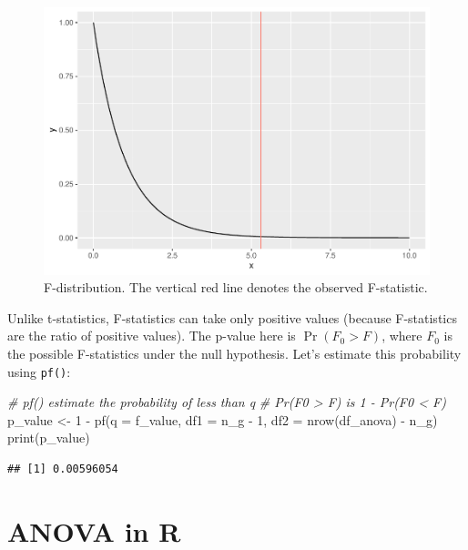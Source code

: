 \documentclass[
]{book}
\newenvironment{Shaded}{\begin{snugshade}}{\end{snugshade}}
\newcommand{\AttributeTok}[1]{\textcolor[rgb]{0.77,0.63,0.00}{#1}}
\newcommand{\CommentTok}[1]{\textcolor[rgb]{0.56,0.35,0.01}{\textit{#1}}}
\newcommand{\DecValTok}[1]{\textcolor[rgb]{0.00,0.00,0.81}{#1}}
\newcommand{\FunctionTok}[1]{\textcolor[rgb]{0.00,0.00,0.00}{#1}}
\newcommand{\NormalTok}[1]{#1}
\newcommand{\OtherTok}[1]{\textcolor[rgb]{0.56,0.35,0.01}{#1}}
\newcommand{\SpecialCharTok}[1]{\textcolor[rgb]{0.00,0.00,0.00}{#1}}
\begin{document}
\begin{figure}

{\centering \includegraphics{biostats_files/figure-latex/f-dist-1} 

}

\caption{F-distribution. The vertical red line denotes the observed F-statistic.}\label{fig:f-dist}
\end{figure}

Unlike t-statistics, F-statistics can take only positive values (because F-statistics are the ratio of positive values). The p-value here is \(\Pr(F_0 > F)\), where \(F_0\) is the possible F-statistics under the null hypothesis. Let's estimate this probability using \texttt{pf()}:

\begin{Shaded}
\begin{Highlighting}[]
\CommentTok{\# pf() estimate the probability of less than q}
\CommentTok{\# Pr(F0 \textgreater{} F) is 1 {-} Pr(F0 \textless{} F)}
\NormalTok{p\_value }\OtherTok{\textless{}{-}} \DecValTok{1} \SpecialCharTok{{-}} \FunctionTok{pf}\NormalTok{(}\AttributeTok{q =}\NormalTok{ f\_value, }\AttributeTok{df1 =}\NormalTok{ n\_g }\SpecialCharTok{{-}} \DecValTok{1}\NormalTok{, }\AttributeTok{df2 =} \FunctionTok{nrow}\NormalTok{(df\_anova) }\SpecialCharTok{{-}}\NormalTok{ n\_g)}
\FunctionTok{print}\NormalTok{(p\_value)}
\end{Highlighting}
\end{Shaded}

\begin{verbatim}
## [1] 0.00596054
\end{verbatim}

\hypertarget{anova-in-r}{%
\section{ANOVA in R}\label{anova-in-r}}
\end{document}
